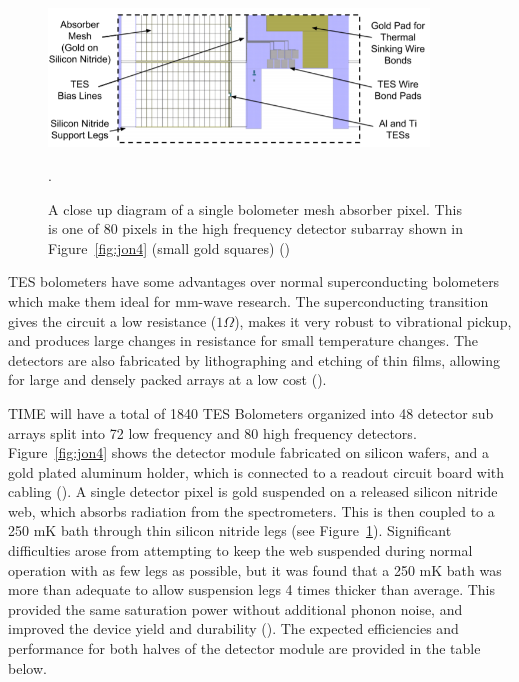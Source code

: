 \documentclass[manuscript]{aastex}
\begin{document}
\begin{figure}[H]
\centering
\captionsetup{width=0.9\textwidth}
\includegraphics[width=0.9\textwidth]{jon5.PNG}
\caption[Single TES Detector Pixel -(\cite{Hunacek2016b})]{A close up diagram of a single bolometer mesh absorber pixel. This is one of 80 pixels in the high frequency detector subarray shown in Figure~\ref{fig:jon4} (small gold squares) (\cite{Hunacek2016b})}. 
\label{fig:jon5}
\vspace{-0.8cm}
\end{figure}

TES bolometers have some advantages over normal superconducting bolometers which make them ideal for mm-wave research. The superconducting transition gives the circuit a low resistance (\(1\Omega\)), makes it very robust to vibrational pickup, and produces large changes in resistance for small temperature changes. The detectors are also fabricated by lithographing and etching of thin films, allowing for large and densely packed arrays at a low cost (\cite{O'Brient2010}).

TIME will have a total of 1840 TES Bolometers organized into 48 detector sub arrays split into 72 low frequency and 80 high frequency detectors. Figure~\ref{fig:jon4} shows the detector module fabricated on silicon wafers, and a gold plated aluminum holder, which is connected to a readout circuit board with cabling (\cite{Hunacek2016}). A single detector pixel is gold suspended on a released silicon nitride web, which absorbs radiation from the spectrometers. This is then coupled to a 250 mK bath through thin silicon nitride legs (see Figure~\ref{fig:jon5}). Significant difficulties arose from attempting to keep the web suspended during normal operation with as few legs as possible, but it was found that a 250 mK bath was more than adequate to allow suspension legs 4 times thicker than average. This provided the same saturation power without additional phonon noise, and improved the device yield and durability (\cite{Hunacek2016b}). The expected efficiencies and performance for both halves of the detector module are provided in the table below.
\end{document}
